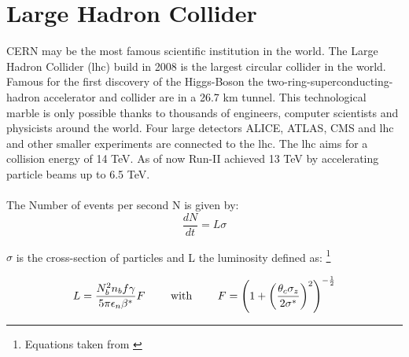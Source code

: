 \documentclass[../Bachelorarbeit.tex]{subfiles}
\begin{document}
\label{sec:LHC}
\section{Large Hadron Collider}
CERN may be the most famous scientific institution in the world. The Large Hadron Collider (\acrshort{lhc})\cite{Evans.2008} build in 2008 is the largest circular collider in the world.
Famous for the first discovery of the Higgs-Boson the two-ring-superconducting- hadron accelerator and collider are in a 26.7 km tunnel.
This technological marble is only possible thanks to thousands of engineers, computer scientists and physicists around the world.
Four large detectors ALICE, ATLAS, CMS and \acrshort{lhc} and other smaller experiments are connected to the \acrshort{lhc}.
The \acrshort{lhc} aims for a collision energy of 14 TeV. As of now Run-II achieved 13 TeV by accelerating particle beams up to 6.5 TeV.\\\\
The Number of events per second N is given by:
\begin{equation}
    \frac{dN}{dt} = L \sigma
\end{equation}

$\sigma$ is the cross-section of particles and L the luminosity defined as:
\footnote{Equations taken from \cite{Evans.2008}}

\begin{equation}
    L= \frac{N_{b}^{2} n_{b} f \gamma}{5 \pi \epsilon_{n} \beta^{*}} F \qquad \textnormal{ with } \qquad  F=\left( 1 + \left( \frac{\theta_{c} \sigma_{z}}{2 \sigma^{*}}\right)^{2} \right)^{-\frac{1}{2}}
\end{equation}
\end{document}
